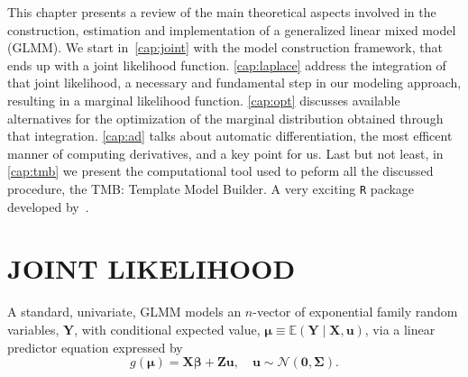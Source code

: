 This chapter presents a review of the main theoretical aspects involved
in the construction, estimation and implementation of a generalized
linear mixed model (GLMM). We start in~\autoref{cap:joint} with the
model construction framework, that ends up with a joint likelihood
function. \autoref{cap:laplace} address the integration of that joint
likelihood, a necessary and fundamental step in our modeling approach,
resulting in a marginal likelihood function. \autoref{cap:opt} discusses
available alternatives for the optimization of the marginal distribution
obtained through that integration. \autoref{cap:ad} talks about
automatic differentiation, the most efficent manner of computing
derivatives, and a key point for us. Last but not least, in
\autoref{cap:tmb} we present the computational tool used to peform all
the discussed procedure, the TMB: Template Model Builder. A very
exciting \texttt{R} \cite{R18} package developed by~.

\section{JOINT LIKELIHOOD}
\label{cap:joint}

A standard, univariate, GLMM models an \(n\)-vector of exponential
family random variables, \(\mathbf{Y}\), with conditional expected
value, \(\bm{\mu} \equiv \mathbb{E}(\mathbf{Y} \mid \mathbf{X},
\mathbf{u})\), via a linear predictor equation expressed by
\begin{equation}
  g(\bm{\mu}) = \mathbf{X} \bm{\beta} + \mathbf{Zu}, \quad
  \mathbf{u} \sim \mathcal{N}(\mathbf{0}, \bm{\Sigma}).
  \label{eq:gmu}
\end{equation}


